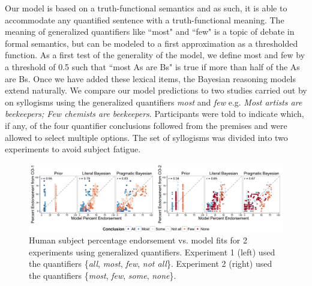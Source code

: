 \documentclass[10pt,letterpaper]{article}
\begin{document}
Our model is based on a truth-functional semantics and as such, it is able to accommodate any quantified sentence with a truth-functional meaning. The meaning of generalized quantifiers like ``most" and ``few" is a topic of debate in formal semantics, but can be modeled to a first approximation as a thresholded function. As a first test of the generality of the model, we define most and few by a threshold of 0.5 such that ``most As are Bs" is true if more than half of the As are Bs. Once we have added these lexical items, the Bayesian reasoning models extend naturally. 
%
We compare our model predictions to two studies carried out by  on syllogisms using the generalized quantifiers \emph{most} and \emph{few} e.g. \emph{Most artists are beekeepers; Few chemists are beekeepers}. Participants were told to indicate which, if any, of the four quantifier conclusions followed from the premises and were allowed to select multiple options.
%
The set of syllogisms was divided into two experiments to avoid subject fatigue.

\begin{figure}[t]
	\centering
  \includegraphics[width=\textwidth]{fig4_multiScatter_colorset_AMFO_MFIE_n6_br0,30}
      \caption{Human subject percentage endorsement vs. model fits for 2 experiments using generalized quantifiers. Experiment 1 (left) used the quantifiers \{\emph{all}, \emph{most}, \emph{few}, \emph{not all}\}. Experiment 2 (right) used the quantifiers \{\emph{most}, \emph{few}, \emph{some}, \emph{none}\}.}
  \label{fig:mfScatter}
\end{figure}
\end{document}
